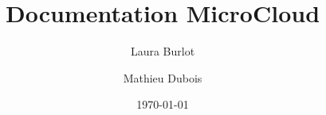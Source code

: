 \documentclass{article}
\title{Documentation MicroCloud}
\author{Laura Burlot \and Mathieu Dubois}
\date{\today}
\begin{document}
\maketitle
\sloppy
\newpage

\tableofcontents
\newpage
















\end{document}
